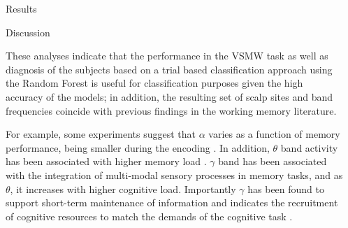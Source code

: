 \documentclass[final]{beamer}
\newlength{\sepwidth}
\newlength{\colwidth}
\newcommand{\separatorcolumn}{\begin{column}{\sepwidth}\end{column}}
\begin{document}
\begin{frame}[t]
\begin{columns}[t]
\begin{column}{\colwidth}
\begin{block}{Results}
  \end{block}

  \begin{block}{Discussion}

    These analyses indicate that the performance in the VSMW task as well as diagnosis of the subjects based on a trial based classification approach using the Random Forest is useful for classification purposes given the high accuracy of the models; in addition, the resulting set of scalp sites and band frequencies coincide with previous findings in the working memory literature.

    For example, some experiments suggest that $\alpha$ varies as a function of memory performance, being smaller during the encoding \citep{klimesch1997eeg}. In addition, $\theta$ band activity has been associated with higher memory load \citep{boonstra2013effects}. $\gamma$ band has been associated with the integration of multi-modal sensory processes in memory tasks, and as $\theta$, it increases with higher cognitive load. Importantly $\gamma$ has been found to support short-term maintenance of information and indicates the recruitment of cognitive resources to match the demands of the cognitive task \citep{howard2003gamma}.

  \end{block}





\end{column}

\separatorcolumn
\end{columns}
\end{frame}
\end{document}
